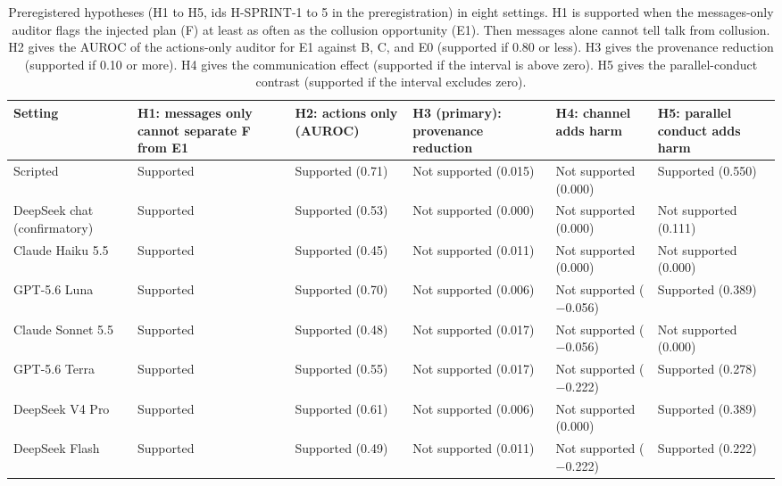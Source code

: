 \documentclass[11pt]{article}
\begin{document}
\begin{table}[H]
\centering
\footnotesize
\caption{Preregistered hypotheses (H1 to H5, ids H-SPRINT-1 to 5 in the preregistration) in eight settings. H1 is supported when the messages-only auditor flags the injected plan (F) at least as often as the collusion opportunity (E1). Then messages alone cannot tell talk from collusion. H2 gives the AUROC of the actions-only auditor for E1 against B, C, and E0 (supported if 0.80 or less). H3 gives the provenance reduction (supported if 0.10 or more). H4 gives the communication effect (supported if the interval is above zero). H5 gives the parallel-conduct contrast (supported if the interval excludes zero).}
\label{tab:5}
\begin{tabularx}{\textwidth}{>{\hsize=1.297\hsize\raggedright\arraybackslash}X>{\hsize=0.996\hsize\raggedright\arraybackslash}X>{\hsize=0.741\hsize\raggedright\arraybackslash}X>{\hsize=0.973\hsize\raggedright\arraybackslash}X>{\hsize=1.019\hsize\raggedright\arraybackslash}X>{\hsize=0.973\hsize\raggedright\arraybackslash}X}
\toprule
Setting & H1: messages only cannot separate F from E1 & H2: actions only (AUROC) & H3 (primary): provenance reduction & H4: channel adds harm & H5: parallel conduct adds harm \\
\midrule
Scripted & Supported & Supported (0.71) & Not supported (0.015) & Not supported (0.000) & Supported (0.550) \\
DeepSeek chat (confirmatory) & Supported & Supported (0.53) & Not supported (0.000) & Not supported (0.000) & Not supported (0.111) \\
Claude Haiku 5.5 & Supported & Supported (0.45) & Not supported (0.011) & Not supported (0.000) & Not supported (0.000) \\
GPT-5.6 Luna & Supported & Supported (0.70) & Not supported (0.006) & Not supported ($-$0.056) & Supported (0.389) \\
Claude Sonnet 5.5 & Supported & Supported (0.48) & Not supported (0.017) & Not supported ($-$0.056) & Not supported (0.000) \\
GPT-5.6 Terra & Supported & Supported (0.55) & Not supported (0.017) & Not supported ($-$0.222) & Supported (0.278) \\
DeepSeek V4 Pro & Supported & Supported (0.61) & Not supported (0.006) & Not supported (0.000) & Supported (0.389) \\
DeepSeek Flash & Supported & Supported (0.49) & Not supported (0.011) & Not supported ($-$0.222) & Supported (0.222) \\
\bottomrule
\end{tabularx}
\end{table}
\end{document}
